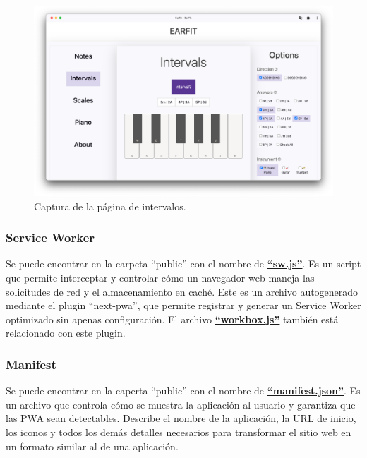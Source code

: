 \documentclass[12pt,twoside,titlepage]{report}
\begin{document}
\begin{figure}[H]
    \centering
    \includegraphics[width=\textwidth]{Capturas Earfit/PC/Intervals}
    \caption{Captura de la página de intervalos.}
    \label{fig:PCIntervals1}
\end{figure}


\subsubsection{Service Worker}
\label{sec:serviceWorker}

Se puede encontrar en la carpeta ``public'' con el nombre de \href{https://github.com/alberttogoca/EarFit/blob/main/public/sw.js}{\textbf{``sw.js''}}. Es un script que permite interceptar y controlar cómo un navegador web maneja las solicitudes de red y el almacenamiento en caché. Este es un archivo autogenerado mediante el plugin ``next-pwa'', que permite registrar y generar un Service Worker optimizado sin apenas configuración. El archivo \href{https://github.com/alberttogoca/EarFit/blob/main/public/workbox-1846d813.js}{\textbf{``workbox.js''}} también está relacionado con este plugin.
\cite{serviceworker}

\subsubsection{Manifest}
\label{sec:manifest}

Se puede encontrar en la caperta ``public'' con el nombre de \href{https://github.com/alberttogoca/EarFit/blob/main/public/manifest.json}{\textbf{``manifest.json''}}. Es un archivo que controla cómo se muestra la aplicación al usuario y garantiza que las PWA sean detectables. Describe el nombre de la aplicación, la URL de inicio, los iconos y todos los demás detalles necesarios para transformar el sitio web en un formato similar al de una aplicación. 
\cite{manifest}
\end{document}
